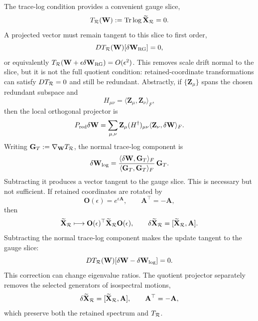 The trace-log condition provides a convenient gauge slice,
\begin{equation}
  T_{\mathcal R}(\mathbf W):=\operatorname{Tr}\log\widetilde{\mathbf X}_{\mathcal R}=0.
\end{equation}
A projected vector must remain tangent to this slice to first order,
\begin{equation}
  DT_{\mathcal R}(\mathbf W)[\delta\mathbf W_{\rm RG}]=0,
\end{equation}
or equivalently $T_{\mathcal R}(\mathbf W+\epsilon\delta\mathbf W_{\rm RG})=O(\epsilon^2)$. This removes scale drift normal to the slice, but it is not the full quotient condition: retained-coordinate transformations can satisfy $DT_{\mathcal R}=0$ and still be redundant. Abstractly, if $\{\mathbf Z_\mu\}$ spans the chosen redundant subspace and
\begin{equation}
  H_{\mu\nu}=\langle\mathbf Z_\mu,\mathbf Z_\nu\rangle_F,
\end{equation}
then the local orthogonal projector is
\begin{equation}
  P_{\mathrm{red}}\delta\mathbf W
  =\sum_{\mu,\nu}\mathbf Z_\mu(H^{\dagger})_{\mu\nu}
    \langle\mathbf Z_\nu,\delta\mathbf W\rangle_F.
\end{equation}
Writing $\mathbf G_T:=\nabla_{\mathbf W}T_{\mathcal R}$, the normal trace-log component is
\begin{equation}
  \delta\mathbf W_{\log}
  =\frac{\langle\delta\mathbf W,\mathbf G_T\rangle_F}
  {\langle\mathbf G_T,\mathbf G_T\rangle_F}\,\mathbf G_T.
\end{equation}
Subtracting it produces a vector tangent to the gauge slice. This is necessary but not sufficient. If retained coordinates are rotated by
\begin{equation}
  \mathbf O(\epsilon)=e^{\epsilon\mathbf A},
  \qquad \mathbf A^{\top}=-\mathbf A,
\end{equation}
then
\begin{equation}
  \widetilde{\mathbf X}_{\mathcal R}\longmapsto
  \mathbf O(\epsilon)^{\top}\widetilde{\mathbf X}_{\mathcal R}\mathbf O(\epsilon),
  \qquad
  \delta\widetilde{\mathbf X}_{\mathcal R}=[\widetilde{\mathbf X}_{\mathcal R},\mathbf A].
\end{equation}
Subtracting the normal trace-log component makes the update tangent to the gauge slice:
\begin{equation}
  DT_{\mathcal R}(\mathbf W)[\delta\mathbf W-\delta\mathbf W_{\log}]=0.
\end{equation}
This correction can change eigenvalue ratios. The quotient projector separately removes the selected generators of isospectral motions,
\begin{equation}
  \delta\widetilde{\mathbf X}_{\mathcal R}=[\widetilde{\mathbf X}_{\mathcal R},\mathbf A],
  \qquad \mathbf A^{\top}=-\mathbf A,
\end{equation}
which preserve both the retained spectrum and $T_{\mathcal R}$.

